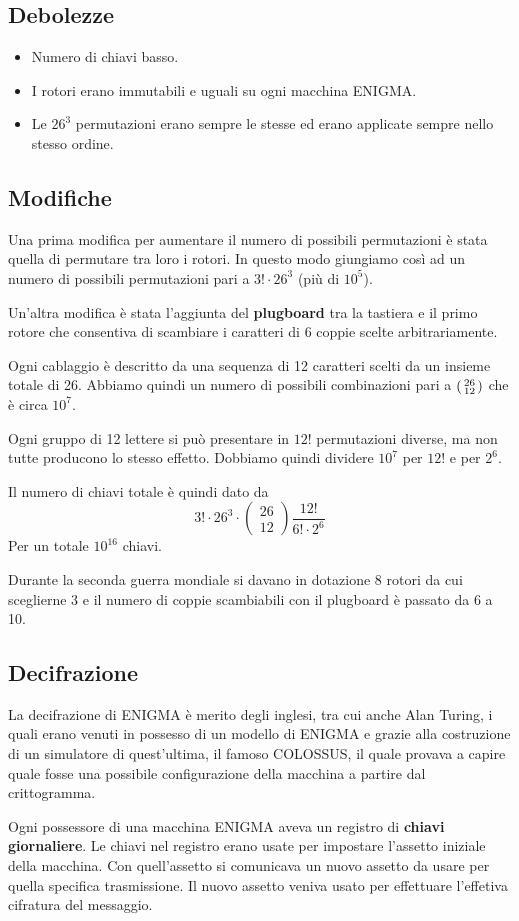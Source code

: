 \subsection{Debolezze}
\begin{itemize}
	\item Numero di chiavi basso.
	\item I rotori erano immutabili e uguali su ogni macchina ENIGMA.
	\item Le $26^3$ permutazioni erano sempre le stesse ed erano applicate sempre nello stesso ordine.
\end{itemize}

\subsection{Modifiche}
Una prima modifica per aumentare il numero di possibili permutazioni \`e stata quella di permutare tra loro i rotori. In
questo modo giungiamo cos\`i ad un numero di possibili permutazioni pari a $3! \cdot 26^3$ (pi\`u di $10^5$).

Un'altra modifica \`e stata l'aggiunta del \textbf{plugboard} tra la tastiera e il primo rotore che consentiva di scambiare
i caratteri di 6 coppie scelte arbitrariamente.

Ogni cablaggio \`e descritto da una sequenza di 12 caratteri scelti da un insieme totale di 26. Abbiamo quindi un numero
di possibili combinazioni pari a $\begin{psmallmatrix} 26 \\ 12 \end{psmallmatrix}$ che \`e circa $10^7$.

Ogni gruppo di 12 lettere si pu\`o presentare in $12!$ permutazioni diverse, ma non tutte producono lo stesso effetto.
Dobbiamo quindi dividere $10^7$ per $12!$ e per $2^6$.

Il numero di chiavi totale \`e quindi dato da
\[
	3! \cdot 26^3 \cdot
	\begin{pmatrix}
		26 \\ 12
	\end{pmatrix}
	\frac{12!}{6! \cdot 2^6}
\]
Per un totale $10^{16}$ chiavi.

Durante la seconda guerra mondiale si davano in dotazione 8 rotori da cui sceglierne 3 e il numero di coppie scambiabili
con il plugboard \`e passato da 6 a 10.

\subsection{Decifrazione}
La decifrazione di ENIGMA \`e merito degli inglesi, tra cui anche Alan Turing, i quali erano venuti in possesso di un
modello di ENIGMA e grazie alla costruzione di un simulatore di quest'ultima, il famoso COLOSSUS, il quale provava a
capire quale fosse una possibile configurazione della macchina a partire dal crittogramma.

Ogni possessore di una macchina ENIGMA aveva un registro di \textbf{chiavi giornaliere}. Le chiavi nel registro erano usate
per impostare l'assetto iniziale della macchina. Con quell'assetto si comunicava un nuovo assetto da usare per quella
specifica trasmissione. Il nuovo assetto veniva usato per effettuare l'effetiva cifratura del messaggio.